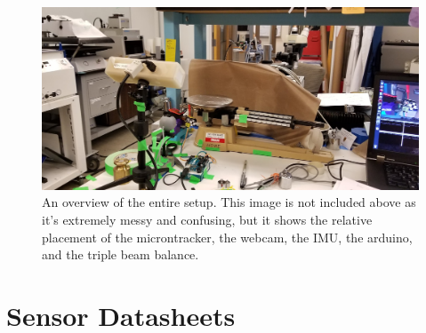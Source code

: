 \documentclass[preprint,12pt,3p]{elsarticle}
\begin{document}
\begin{figure}[H]
\centering
\includegraphics[width=1\textwidth]{images/setup/setup_overview.jpg}
\caption{An overview of the entire setup. This image is not included above as it's extremely messy and confusing, but it shows the relative placement of the microntracker, the webcam, the IMU, the arduino, and the triple beam balance.
}
\end{figure}

\section{Sensor Datasheets}
\label{appendix-sensors}
\end{document}
